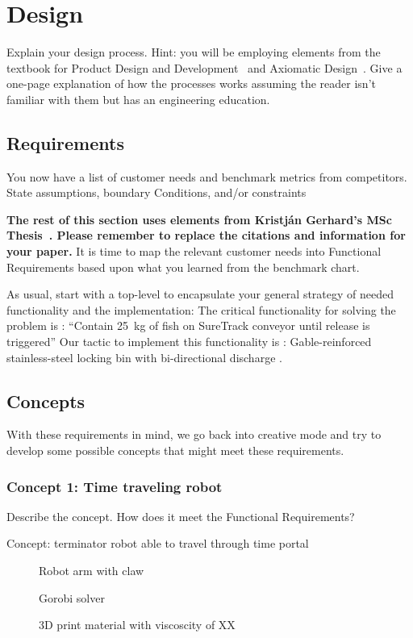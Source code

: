 \chapter{Design\label{cha:design}}
Explain your design process.
Hint:  you will be employing elements from the textbook for Product Design and Development~\cite{ulrich2020product-design-development} and Axiomatic Design~\cite{suh2021des}.
Give a one-page explanation of how the processes works assuming the reader isn't familiar with them but has an engineering education.


\section{Requirements}
You now have a list of customer needs and benchmark metrics from competitors.
State assumptions, boundary Conditions, and/or constraints

\textbf{The rest of this section uses elements from Kristján Gerhard's MSc Thesis~\cite{gerhard2016suretrack}.
Please remember to replace the citations and information for your paper.}
It is time to map the relevant customer needs into Functional Requirements based upon what you learned from the benchmark chart.

As usual, start with a top-level to encapsulate your general strategy of needed functionality and the implementation:
The critical functionality for solving the problem is  : ``Contain \SI{25}{\kilogram} of fish on SureTrack conveyor until release is triggered''
Our tactic to implement this functionality is : Gable-reinforced stainless-steel locking bin with bi-directional discharge
\cite{gerhard2016suretrack}.

\section{Concepts}\label{sec:concepts}
With these requirements in mind, we go back into creative mode and try to develop some possible concepts that might meet these requirements.
\subsection{Concept 1: Time traveling robot}\label{sec:concept-1}
Describe the concept.  How does it meet the Functional Requirements?

Concept:  terminator robot able to travel through time portal
\begin{description}
  \item[]  Robot arm with claw
  \item[] Gorobi solver
  \item[]  3D print material with viscoscity of XX
\end{description}

